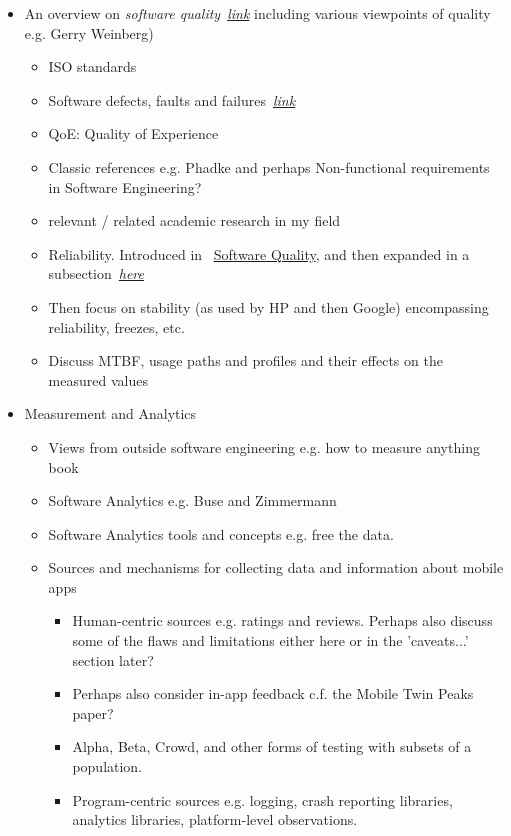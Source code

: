 \begin{itemize}
    \item An overview on \emph{software quality}~\hyperlink{software.quality}{\emph{link}}
including various viewpoints of quality e.g. Gerry Weinberg)
    \begin{itemize} 
        \item ISO standards
        \item Software defects, faults and failures~\hyperlink{defects.faults.failures}{\emph{link}}
        \item QoE: Quality of Experience
        \item Classic references e.g. Phadke and perhaps Non-functional requirements in Software Engineering? 
        \item relevant / related academic research in my field
        \item Reliability. Introduced in ~\hyperlink{software.quality}{Software Quality}, and then expanded in a subsection~\hyperlink{software.reliability}{\emph{here}}
        \item Then focus on stability (as used by HP and then Google) encompassing reliability, freezes, etc.
        \item Discuss MTBF, usage paths and profiles and their effects on the measured values
    \end{itemize}
    \item Measurement and Analytics
    \begin{itemize}
        \item Views from outside software engineering e.g. how to measure anything book
        \item Software Analytics e.g. Buse and Zimmermann
        \item Software Analytics tools and concepts e.g. free the data.
        \item Sources and mechanisms for collecting data and information about mobile apps
        \begin{itemize}
            \item Human-centric sources e.g. ratings and reviews. Perhaps also discuss some of the flaws and limitations either here or in the 'caveats...' section later?
            \item Perhaps also consider in-app feedback c.f. the Mobile Twin Peaks paper?
            \item Alpha, Beta, Crowd, and other forms of testing with subsets of a population.
            \item Program-centric sources e.g. logging, crash reporting libraries, analytics libraries, platform-level observations.

\end{itemize}
\end{itemize}
\end{itemize}

